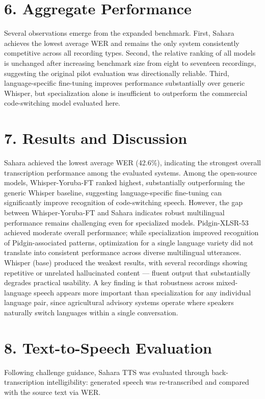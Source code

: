\documentclass[9pt,twocolumn]{article}
\begin{document}
\section*{6. Aggregate Performance}
Several observations emerge from the expanded benchmark. First, Sahara achieves the lowest average WER and remains the only system consistently competitive across all recording types. Second, the relative ranking of all models is unchanged after increasing benchmark size from eight to seventeen recordings, suggesting the original pilot evaluation was directionally reliable. Third, language-specific fine-tuning improves performance substantially over generic Whisper, but specialization alone is insufficient to outperform the commercial code-switching model evaluated here.

\section*{7. Results and Discussion}
Sahara achieved the lowest average WER (42.6\%), indicating the strongest overall transcription performance among the evaluated systems. Among the open-source models, Whisper-Yoruba-FT ranked highest, substantially outperforming the generic Whisper baseline, suggesting language-specific fine-tuning can significantly improve recognition of code-switching speech. However, the gap between Whisper-Yoruba-FT and Sahara indicates robust multilingual performance remains challenging even for specialized models. Pidgin-XLSR-53 achieved moderate overall performance; while specialization improved recognition of Pidgin-associated patterns, optimization for a single language variety did not translate into consistent performance across diverse multilingual utterances. Whisper (base) produced the weakest results, with several recordings showing repetitive or unrelated hallucinated content --- fluent output that substantially degrades practical usability. A key finding is that robustness across mixed-language speech appears more important than specialization for any individual language pair, since agricultural advisory systems operate where speakers naturally switch languages within a single conversation.

\section*{8. Text-to-Speech Evaluation}
Following challenge guidance, Sahara TTS was evaluated through back-transcription intelligibility: generated speech was re-transcribed and compared with the source text via WER.
\end{document}
